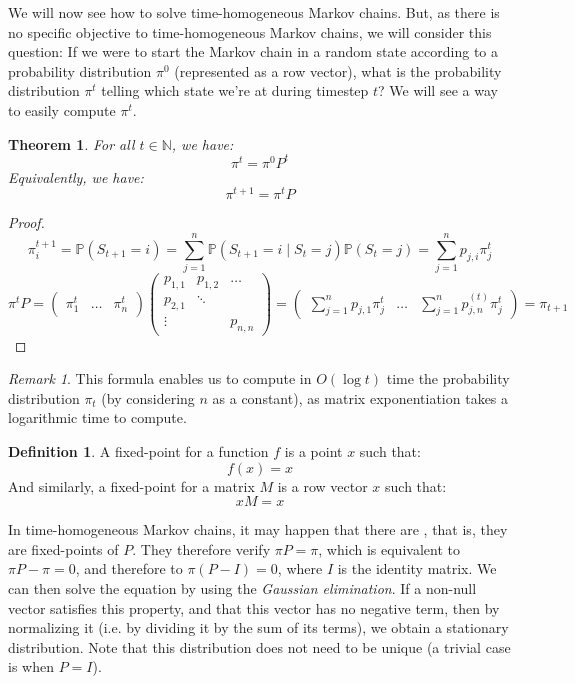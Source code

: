 \documentclass{article}
\newtheorem{theorem}{Theorem}[section]
\theoremstyle{definition}
\newtheorem{definition}{Definition}[section]
\theoremstyle{remark}
\newtheorem*{remark}{Remark}
\theoremstyle{example}
\begin{document}
We will now see how to solve time-homogeneous Markov chains. But, as there is no specific objective to time-homogeneous Markov chains, we will consider this question: If we were to start the Markov chain in a random state according to a probability distribution $\pi^0$ (represented as a row vector), what is the probability distribution $\pi^t$ telling which state we're at during timestep $t$? We will see a way to easily compute $\pi^t$.

\begin{theorem}
		For all $t \in \mathbb{N}$, we have:
				$$\pi^t = \pi^0 P^t$$
		Equivalently, we have:
				$$\pi^{t+1} = \pi^t P$$
\end{theorem}

\begin{proof}
		$$\pi^{t+1}_i = \mathbb{P}(S_{t+1} = i) = \sum_{j=1}^n \mathbb{P}(S_{t+1} = i \mid S_t = j) \mathbb{P}(S_t = j) = \sum_{j=1}^n p_{j,i} \pi^t_j$$
		$$\pi^t P = \begin{pmatrix} \pi^t_1 & \dots & \pi^t_n \end{pmatrix} \begin{pmatrix} p_{1,1} & p_{1,2} & \dots \\ p_{2,1} & \ddots & \\ \vdots & & p_{n,n} \end{pmatrix}
		= \begin{pmatrix} \sum_{j=1}^n p_{j,1} \pi^t_j & \dots & \sum_{j=1}^n p_{j,n}^{(t)} \pi^t_j \end{pmatrix}
		= \pi_{t+1}$$
\end{proof}

\begin{remark}
		This formula enables us to compute in $O(\log t)$ time the probability distribution $\pi_t$ (by considering $n$ as a constant), as matrix exponentiation takes a logarithmic time to compute.
\end{remark}

\begin{definition}
		A fixed-point for a function $f$ is a point $x$ such that:
				$$f(x) = x$$
		And similarly, a fixed-point for a matrix $M$ is a row vector $x$ such that:
				$$xM = x$$
\end{definition}

In time-homogeneous Markov chains, it may happen that there are , that is, they are fixed-points of $P$. They therefore verify $\pi P = \pi$, which is equivalent to $\pi P - \pi = 0$, and therefore to $\pi(P - I) = 0$, where $I$ is the identity matrix. We can then solve the equation by using the \textit{Gaussian elimination}. If a non-null vector satisfies this property, and that this vector has no negative term, then by normalizing it (i.e. by dividing it by the sum of its terms), we obtain a stationary distribution. Note that this distribution does not need to be unique (a trivial case is when $P=I$).
\end{document}
